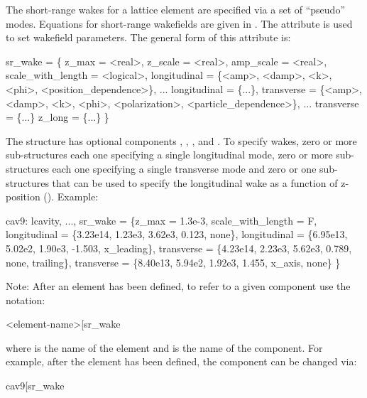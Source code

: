 The short-range wakes for a lattice element are specified via a set of ``pseudo'' modes.  Equations
for short-range wakefields are given in .  The  attribute is used to set
wakefield parameters. The general form of this attribute is:
\begin{example}
  sr_wake = \{
      z_max = <real>, z_scale = <real>, amp_scale = <real>, 
      scale_with_length = <logical>,
      longitudinal = \{<amp>, <damp>, <k>, <phi>, <position_dependence>\},
      ...
      longitudinal = \{...\}, 
      transverse = \{<amp>, <damp>, <k>, <phi>, <polarization>, <particle_dependence>\},
      ...
      transverse = \{...\} 
      z_long = \{...\}
    \}
\end{example}
The  structure has optional components , , , and
. To specify wakes, zero or more  sub-structures each one specifying
a single longitudinal mode, zero or more  sub-structures each one specifying a
single transverse mode and zero or one  sub-structures that can be used to specify the longitudinal
wake as a function of z-position (). Example:
\begin{example}
  cav9: lcavity, ..., sr_wake = \{z_max = 1.3e-3, scale_with_length = F, 
       longitudinal = \{3.23e14, 1.23e3, 3.62e3, 0.123, none\}, 
       longitudinal = \{6.95e13, 5.02e2, 1.90e3, -1.503, x_leading\}, 
       transverse = \{4.23e14, 2.23e3, 5.62e3, 0.789, none,  trailing\},
       transverse = \{8.40e13, 5.94e2, 1.92e3, 1.455, x_axis, none\} \}
\end{example}
Note: After an element has been defined, to refer to a given component use the notation:
\begin{example}
  <element-name>[sr_wake%
\end{example}
where  is the name of the element and  is the name of the component.
For example, after the  element has been defined, the  component can be changed via:
\begin{example}
  cav9[sr_wake%
\end{example}

